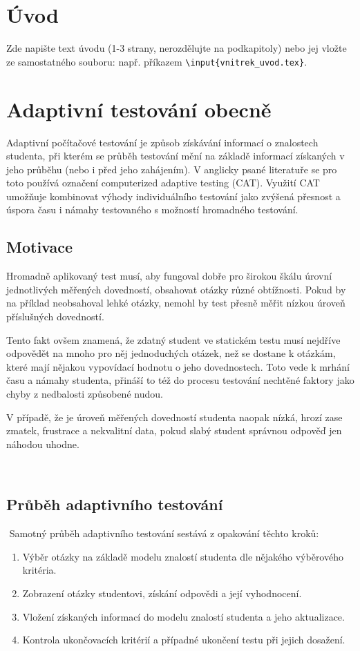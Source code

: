 \documentclass[a4paper,twoside,12pt]{book}
\begin{document}
\chapter*{Úvod} %
%
Zde napište text úvodu (1-3 strany, nerozdělujte na podkapitoly) nebo jej vložte ze samostatného souboru: např. příkazem \texttt{\textbackslash input\{vnitrek\_uvod.tex\}}.
%
%


\chapter{Adaptivní testování obecně}
Adaptivní počítačové testování je způsob získávání informací o znalostech studenta, při kterém se průběh testování mění na základě informací získaných v jeho průběhu (nebo i před jeho zahájením). V anglicky psané literatuře se pro toto používá označení computerized adaptive testing (CAT). Využití CAT umožňuje kombinovat výhody individuálního testování jako zvýšená přesnost a úspora času i námahy testovaného s možností hromadného testování.

\section{Motivace}
Hromadně aplikovaný test musí, aby fungoval dobře pro širokou škálu úrovní jednotlivých měřených dovedností, obsahovat otázky různé obtížnosti. Pokud by na příklad neobsahoval lehké otázky, nemohl by test přesně měřit nízkou úroveň příslušných dovedností.

Tento fakt ovšem znamená, že zdatný student ve statickém testu musí nejdříve odpovědět na mnoho pro něj jednoduchých otázek, než se dostane k otázkám, které mají nějakou vypovídací hodnotu o jeho dovednostech. Toto vede k mrhání času a námahy studenta, přináší to též do procesu testování nechtěné faktory jako chyby z nedbalosti způsobené nudou.

V případě, že je úroveň měřených dovedností studenta naopak nízká, hrozí zase zmatek, frustrace a nekvalitní data, pokud slabý student správnou odpověď jen náhodou uhodne. \cite[strana 10]{Wainer2000}

 \section{Průběh adaptivního testování}
 Samotný průběh adaptivního testování sestává z opakování těchto kroků:
\begin{enumerate}
	\item Výběr otázky na základě modelu znalostí studenta dle nějakého výběrového kritéria.
	\item Zobrazení otázky studentovi, získání odpovědi a její vyhodnocení.
	\item Vložení získaných informací do modelu znalostí studenta a jeho aktualizace.
	\item Kontrola ukončovacích kritérií a případné ukončení testu při jejich dosažení.
\end{enumerate}
\end{document}
